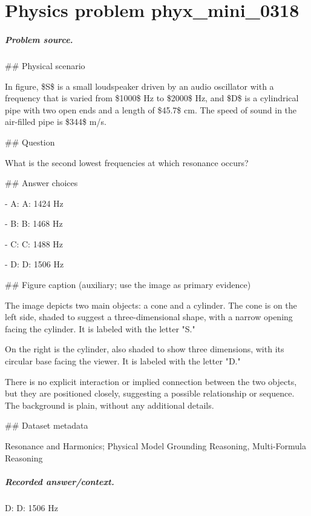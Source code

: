 
\chapter{Physics problem phyx\_mini\_0318}
\label{ch:PhyXMiniProblems_problem_phyx_mini_0318}

\paragraph{Problem source.}
\#\# Physical scenario

In figure, \$S\$ is a small loudspeaker driven by an audio oscillator with a frequency that is varied from \$1000\$ Hz to \$2000\$ Hz, and \$D\$ is a cylindrical pipe with two open ends and a length of \$45.7\$ cm. The speed of sound in the air-filled pipe is \$344\$ m/s.

\#\# Question

What is the second lowest frequencies at which resonance occurs?

\#\# Answer choices

- A: A: 1424 Hz

- B: B: 1468 Hz

- C: C: 1488 Hz

- D: D: 1506 Hz

\#\# Figure caption (auxiliary; use the image as primary evidence)

The image depicts two main objects: a cone and a cylinder. The cone is on the left side, shaded to suggest a three-dimensional shape, with a narrow opening facing the cylinder. It is labeled with the letter "S."

On the right is the cylinder, also shaded to show three dimensions, with its circular base facing the viewer. It is labeled with the letter "D."

There is no explicit interaction or implied connection between the two objects, but they are positioned closely, suggesting a possible relationship or sequence. The background is plain, without any additional details.

\#\# Dataset metadata

Resonance and Harmonics; Physical Model Grounding Reasoning, Multi-Formula Reasoning

\paragraph{Recorded answer/context.}
D: D: 1506 Hz


